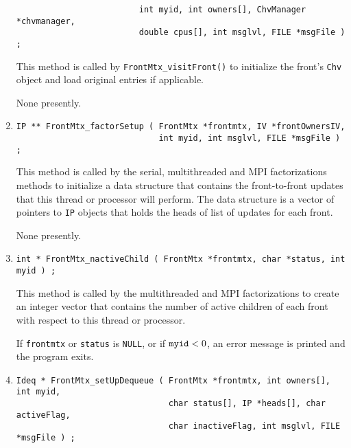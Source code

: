 \begin{enumerate}
\begin{verbatim}
                         int myid, int owners[], ChvManager *chvmanager,
                         double cpus[], int msglvl, FILE *msgFile ) ;
\end{verbatim}
This method is called by {\tt FrontMtx\_visitFront()} to initialize
the front's {\tt Chv} object and load original entries if applicable.
\par {}
None presently.
\item
\begin{verbatim}
IP ** FrontMtx_factorSetup ( FrontMtx *frontmtx, IV *frontOwnersIV,
                             int myid, int msglvl, FILE *msgFile ) ;
\end{verbatim}
This method is called by the serial, multithreaded and MPI
factorizations methods to initialize a data structure that contains
the front-to-front updates that this thread or processor will perform.
The data structure is a vector of pointers to {\tt IP} objects that
holds the heads of list of updates for each front.
\par {}
None presently.
\item
\begin{verbatim}
int * FrontMtx_nactiveChild ( FrontMtx *frontmtx, char *status, int myid ) ;
\end{verbatim}
This method is called by the multithreaded and MPI factorizations
to create an integer vector that contains the number of active
children of each front with respect to this thread or processor.
\par {}
If {\tt frontmtx} or {\tt status} is {\tt NULL},
or if ${\tt myid} < 0$,
an error message is printed and the program exits.
\item
\begin{verbatim}
Ideq * FrontMtx_setUpDequeue ( FrontMtx *frontmtx, int owners[], int myid, 
                               char status[], IP *heads[], char activeFlag,
                               char inactiveFlag, int msglvl, FILE *msgFile ) ;
\end{verbatim}

\end{enumerate}
